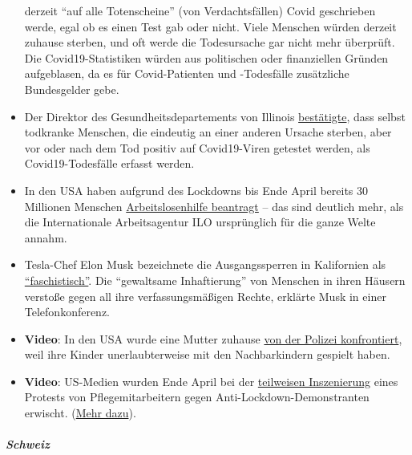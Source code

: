 \begin{itemize}
  derzeit ``auf alle Totenscheine'' (von Verdachts­fällen) Covid
  geschrieben werde, egal ob es einen Test gab oder nicht. Viele
  Menschen würden derzeit zuhause sterben, und oft werde die
  Todesursache gar nicht mehr überprüft. Die Covid19-Statistiken würden
  aus politischen oder finanziellen Gründen aufgeblasen, da es für
  Covid-Patienten und -Todesfälle zusätzliche Bundesgelder gebe.
\item
  Der Direktor des Gesundheitsdepartements von Illinois
  \href{https://week.com/2020/04/20/idph-director-explains-how-covid-deaths-are-classified/}{bestätigte},
  dass selbst todkranke Menschen, die eindeutig an einer anderen Ursache
  sterben, aber vor oder nach dem Tod positiv auf Covid19-Viren getestet
  werden, als Covid19-Todesfälle erfasst werden.
\item
  In den USA haben aufgrund des Lockdowns bis Ende April bereits 30
  Millionen Menschen
  \href{https://edition.cnn.com/2020/04/30/economy/unemployment-benefits-coronavirus/index.html}{Arbeitslosenhilfe
  beantragt} -- das sind deutlich mehr, als die Internationale
  Arbeitsagentur ILO ursprünglich für die ganze Welte annahm.
\item
  Tesla-Chef Elon Musk bezeichnete die Ausgangssperren in Kalifornien
  als
  \href{https://www.theguardian.com/technology/2020/apr/29/tesla-quarterly-earnings-coronavirus-shares}{``faschistisch''}.
  Die ``gewaltsame Inhaftierung'' von Menschen in ihren Häusern verstoße
  gegen all ihre verfassungs­mäßigen Rechte, erklärte Musk in einer
  Telefonkonferenz.
\item
  \textbf{Video}: In den USA wurde eine Mutter zuhause
  \href{https://twitter.com/AlexBerenson/status/1256219418343981056}{von
  der Polizei konfrontiert}, weil ihre Kinder unerlaubterweise mit den
  Nachbarkindern gespielt haben.
\item
  \textbf{Video}: US-Medien wurden Ende April bei der
  \href{https://twitter.com/talialikeitis/status/1253126254942773248}{teilweisen
  Inszenierung} eines Protests von Pflegemitarbeitern gegen
  Anti-Lockdown-Demonstranten erwischt.
  (\href{https://www.buzzfeednews.com/article/tasneemnashrulla/photos-denver-nurses-block-anti-lockdown-protest}{Mehr
  dazu}).
\end{itemize}

\hypertarget{schweiz}{%
\subparagraph{\texorpdfstring{\textbf{Schweiz}}{Schweiz}}\label{schweiz}}

